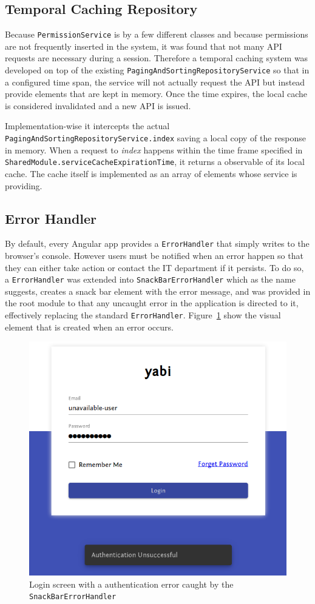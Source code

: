\subsection{Temporal Caching Repository}
Because \texttt{PermissionService} is by a few different classes and because permissions are not frequently inserted in the system, it was found that not many \gls{API} requests are necessary during a session. Therefore a temporal caching system was developed on top of the existing \texttt{PagingAndSortingRepositoryService} so that in a configured time span, the service will not actually request the \gls{API} but instead provide elements that are kept in memory. Once the time expires, the local cache is considered invalidated and a new \gls{API} is issued.

Implementation-wise it intercepts the actual \texttt{PagingAndSortingRepositoryService.index} saving a local copy of the response in memory. When a request to \textit{index} happens within the time frame specified in \texttt{SharedModule.serviceCacheExpirationTime}, it returns a observable of its local cache. The cache itself is implemented as an array of elements whose service is providing.

\subsection{Error Handler}
By default, every Angular app provides a \texttt{ErrorHandler} that simply writes to the browser's console. However users must be notified when an error happen so that they can either take action or contact the IT department if it persists. To do so, a \texttt{ErrorHandler} was extended into \texttt{SnackBarErrorHandler} which as the name suggests, creates a snack bar element with the error message, and was provided in the root module to that any uncaught error in the application is directed to it, effectively replacing the standard \texttt{ErrorHandler}. Figure~\ref{fig:loginerror} show the visual element that is created when an error occurs.

\begin{figure}
  \centering
  \includegraphics[width=.7\textwidth]{images/screenshots/login-error}
  \caption{Login screen with a authentication error caught by the \texttt{SnackBarErrorHandler}}\label{fig:loginerror}
\end{figure}

